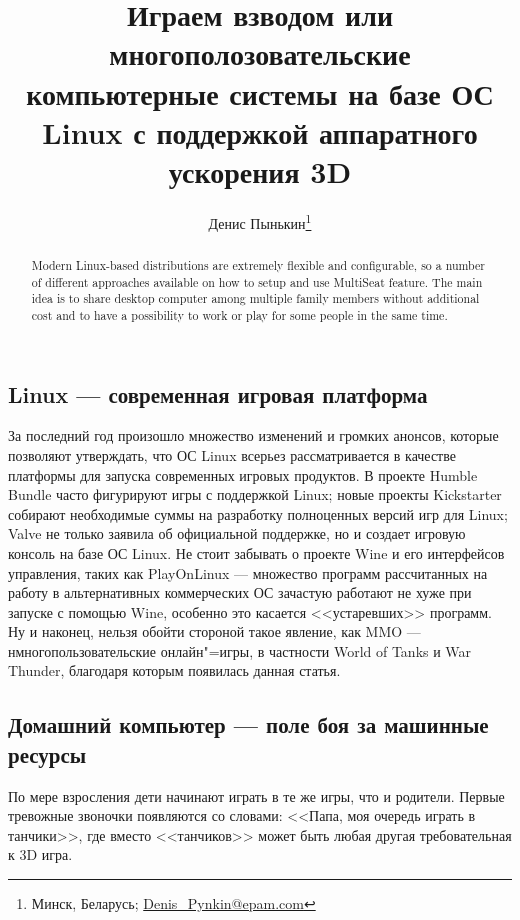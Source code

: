 \documentclass[10pt, a5paper]{article}
\begin{document}
\title{Играем взводом или многополозовательские компьютерные системы на базе ОС Linux с поддержкой аппаратного ускорения 3D}

\author{Денис Пынькин\footnote{Минск, Беларусь; \url{Denis_Pynkin@epam.com}}}
\maketitle

\begin{abstract}
	Modern Linux-based distributions are extremely flexible and configurable, so a number of different approaches available on how to setup and use MultiSeat feature. The main idea is to share desktop computer among multiple family members without additional cost and to have a possibility to work or play for some people in the same time.
\end{abstract}

\subsection*{Linux --- современная игровая платформа}

За последний год произошло множество изменений и громких анонсов, которые позволяют
утверждать, что ОС Linux всерьез рассматривается в качестве платформы для запуска 
современных игровых продуктов. 
В проекте Humble Bundle часто фигурируют игры с поддержкой Linux; новые проекты Kickstarter
собирают необходимые суммы на разработку полноценных версий игр для Linux; Valve не только заявила
об официальной поддержке, но и создает игровую консоль на базе ОС Linux.
Не стоит забывать о проекте Wine и его интерфейсов управления, таких как PlayOnLinux --- множество 
программ рассчитанных на работу в альтернативных коммерческих ОС зачастую работают не хуже 
при запуске с помощью Wine, особенно это касается <<устаревших>> программ.
Ну и наконец, нельзя обойти стороной такое явление, как MMO --- нмногопользовательские онлайн"=игры,
в частности World of Tanks и War Thunder, благодаря которым появилась данная статья. 

\subsection*{Домашний компьютер --- поле боя за машинные ресурсы}

По мере взросления дети начинают играть в те же игры, что и родители. 
Первые тревожные звоночки появляются со словами: <<Папа, моя очередь играть в танчики>>,
где вместо <<танчиков>> может быть любая другая требовательная к 3D игра.
\end{document}
